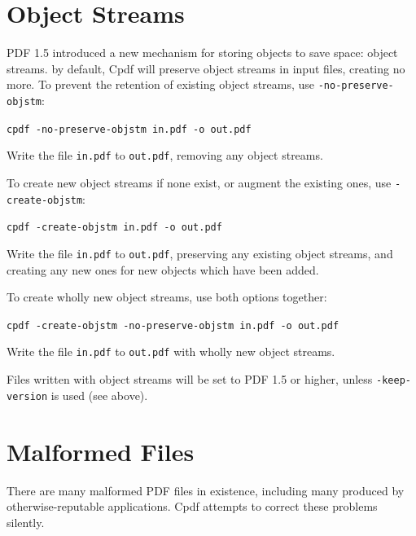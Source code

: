 \documentclass{book}
\begin{document}
\section{Object Streams}
PDF 1.5 introduced a new mechanism for storing objects to save space: object streams. by default, Cpdf will preserve object streams in input files, creating no more. To prevent the retention of existing object streams, use \texttt{-no-preserve-objstm}:

\begin{framed}
\noindent\small\verb!cpdf -no-preserve-objstm in.pdf -o out.pdf!

\vspace{2.5mm}
\noindent Write the file \texttt{in.pdf} to \texttt{out.pdf}, removing any object streams.
\end{framed}

\noindent To create new object streams if none exist, or augment the existing ones, use \texttt{-create-objstm}:

\begin{framed}
\noindent\small\verb!cpdf -create-objstm in.pdf -o out.pdf!

\vspace{2.5mm}
\noindent Write the file \texttt{in.pdf} to \texttt{out.pdf}, preserving any existing object streams, and creating any new ones for new objects which have been added.
\end{framed}

\noindent To create wholly new object streams, use both options together:

\begin{framed}
\noindent\small\verb!cpdf -create-objstm -no-preserve-objstm in.pdf -o out.pdf!

\vspace{2.5mm}
\noindent Write the file \texttt{in.pdf} to \texttt{out.pdf} with wholly new object streams.
\end{framed}

\noindent Files written with object streams will be set to PDF 1.5 or higher, unless \texttt{-keep-version} is used (see above).

\section{Malformed Files}
\label{fast}
There are many malformed PDF files in existence, including many produced by
otherwise-reputable applications. Cpdf attempts to correct these problems
silently.
\end{document}
